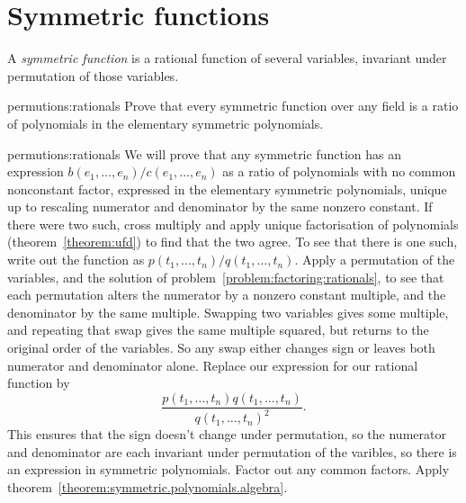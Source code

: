 \section{Symmetric functions}
A \emph{symmetric function} is a rational function of several variables, invariant under permutation of those variables.
\begin{problem}{permutions:rationals}
Prove that every symmetric function over any field is a ratio of polynomials in the elementary symmetric polynomials.
\end{problem}
\begin{answer}{permutions:rationals}
We will prove that any symmetric function has an expression \(b(e_1,\dots,e_n)/c(e_1,\dots,e_n)\) as a ratio of polynomials with no common nonconstant factor, expressed in the elementary symmetric polynomials, unique up to rescaling numerator and denominator by the same nonzero constant.
If there were two such, cross multiply and apply unique factorisation of polynomials (theorem~\vref{theorem:ufd}) to find that the two agree.
To see that there is one such, write out the function as \(p(t_1,\dots,t_n)/q(t_1,\dots,t_n)\).
Apply a permutation of the variables, and the solution of problem~\vref{problem:factoring:rationals}, to see that each permutation alters the numerator by a nonzero constant multiple, and the denominator by the same multiple.
Swapping two variables gives some multiple, and repeating that swap gives the same multiple squared, but returns to the original order of the variables.
So any swap either changes sign or leaves both numerator and denominator alone.
Replace our expression for our rational function by
\[
\frac{p(t_1,\dots,t_n)q(t_1,\dots,t_n)}{q(t_1,\dots,t_n)^2}.
\]
This ensures that the sign doesn't change under permutation, so the numerator and denominator are each invariant under permutation of the varibles, so there is an expression in symmetric polynomials.
Factor out any common factors.
Apply theorem~\vref{theorem:symmetric.polynomials.algebra}.
\end{answer}

